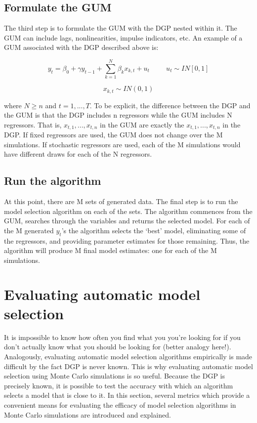 \documentclass[11pt, oneside]{book}   	%
\begin{document}
\subsection{Formulate the GUM}
The third step is to formulate the GUM with the DGP nested within it. The GUM can include lags, nonlinearities, impulse indicators, etc. An example of a GUM associated with the DGP described above is:

$$y_{t}=\beta_{0} + \gamma y_{t-1}+\sum_{k=1}^{N}\beta_{k}x_{k,t} + u_{t}  \hspace{1cm}  u_{t} \sim IN[0, 1]$$

$$x_{k,t} \sim IN(0, 1) $$

where $N \geq n $ and $ t = 1,...,T$. To be explicit, the difference between the DGP and the GUM is that the DGP includes n regressors while the GUM includes N regressors. That is, $x_{t,1},...,x_{t,n}$ in the GUM are exactly the $x_{t,1},...,x_{t,n}$ in the DGP. If fixed regressors are used, the GUM does not change over the M simulations. If stochastic regressors are used, each of the M simulations would have different draws for each of the N regressors. 


 
 \subsection{Run the algorithm}
At this point, there are M sets of generated data. The final step is to run the model selection algorithm on each of the sets. The algorithm commences from the GUM, searches through the variables and returns the selected model. For each of the M generated ${y_{t}}$'s the algorithm selects the `best' model, eliminating some of the regressors, and providing parameter estimates for those remaining. Thus, the algorithm will produce M final model estimates: one for each of the M simulations. 






\section{Evaluating automatic model selection}


It is impossible to know how often you find what you you're looking for if you don't actually know what you should be looking for (better analogy here!). Analogously, evaluating automatic model selection algorithms empirically is made difficult by the fact DGP is never known. This is why evaluating automatic model selection using Monte Carlo simulations is so useful. Because the DGP is precisely known, it is possible to test the accuracy with which an algorithm selects a model that is close to it. In this section, several metrics which provide a convenient means for evaluating the efficacy of model selection algorithms in Monte Carlo simulations are introduced and explained.    
\end{document}
